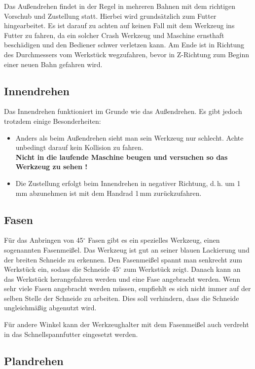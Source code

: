 \documentclass{\basedir/fablab-document}
\begin{document}
Das Außendrehen findet in der Regel in mehreren Bahnen mit dem richtigen Vorschub und Zustellung statt. Hierbei wird grundsätzlich zum Futter hingearbeitet. Es ist darauf zu achten auf keinen Fall mit dem Werkzeug ins Futter zu fahren, da ein solcher Crash Werkzeug und Maschine ernsthaft beschädigen und den Bediener schwer verletzen kann. Am Ende ist in Richtung des Durchmessers vom Werkstück wegzufahren, bevor in Z-Richtung zum Beginn einer neuen Bahn gefahren wird.

\subsection{Innendrehen}

Das Innendrehen funktioniert im Grunde wie das Außendrehen. Es gibt jedoch trotzdem einige Besonderheiten:
\begin{itemize}
\item Anders als beim Außendrehen sieht man sein Werkzeug nur schlecht. Achte unbedingt darauf kein Kollision zu fahren.\\
\textbf{Nicht in die laufende Maschine beugen und versuchen so das Werkzeug zu sehen !}
\item Die Zustellung erfolgt beim Innendrehen in negativer Richtung, d.\,h. um 1\,mm abzunehmen ist mit dem Handrad 1\,mm zurückzufahren.
\end{itemize}

\subsection{Fasen}

Für das Anbringen von 45$^\circ$ Fasen gibt es ein spezielles Werkzeug, einen sogenannten Fasenmeißel. Das Werkzeug ist gut an seiner blauen Lackierung und der breiten Schneide zu erkennen. Den Fasenmeißel spannt man senkrecht zum Werkstück ein, sodass die Schneide 45$^\circ$ zum Werkstück zeigt. Danach kann an das Werkstück herangefahren werden und eine Fase angebracht werden. Wenn sehr viele Fasen angebracht werden müssen, empfiehlt es sich nicht immer auf der selben Stelle der Schneide zu arbeiten. Dies soll verhindern, dass die Schneide ungleichmäßig abgenutzt wird.

Für andere Winkel kann der Werkzeughalter mit dem Fasenmeißel auch verdreht in das Schnellspannfutter eingesetzt werden.

\subsection{Plandrehen}
\label{handdrehen:Plandrehen}
\end{document}
